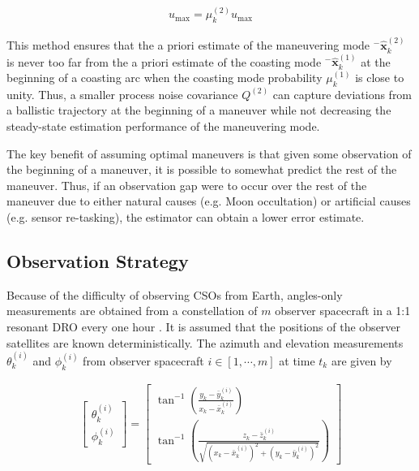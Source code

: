 \documentclass[letterpaper, preprint, paper,11pt]{AAS}	%
\begin{document}
\begin{align}
    u_\text{max} = \mu_k^{(2)} u_\text{max}
\end{align}

This method ensures that the a priori estimate of the maneuvering mode $^-\hat{\bm{x}}_k^{(2)}$ is never too far from the a priori estimate of the coasting mode $^-\hat{\bm{x}}_k^{(1)}$ at the beginning of a coasting arc when the coasting mode probability $\mu_k^{(1)}$ is close to unity. Thus, a smaller process noise covariance $Q^{(2)}$ can capture deviations from a ballistic trajectory at the beginning of a maneuver while not decreasing the steady-state estimation performance of the maneuvering mode. 

The key benefit of assuming optimal maneuvers is that given some observation of the beginning of a maneuver, it is possible to somewhat predict the rest of the maneuver. Thus, if an observation gap were to occur over the rest of the maneuver due to either natural causes (e.g. Moon occultation) or artificial causes (e.g. sensor re-tasking), the estimator can obtain a lower error estimate. 

\subsection{Observation Strategy}

Because of the difficulty of observing CSOs from Earth, angles-only measurements are obtained from a constellation of $m$ observer spacecraft in a 1:1 resonant DRO every one hour \cite{gupta2023constellation}. It is assumed that the positions of the observer satellites are known deterministically. The azimuth and elevation measurements $\theta_k^{(i)}$ and $\phi_k^{(i)}$ from observer spacecraft $i \in [1, \cdots, m]$ at time $t_k$ are given by

\begin{align}
    \begin{bmatrix}
        \theta_k^{(i)} \\
        \phi_k^{(i)}
    \end{bmatrix} = \begin{bmatrix}
        \tan^{-1}\left(\frac{y_k - \bar{y}_k^{(i)}}{x_k - \bar{x}_k^{(i)}}\right) \\
        \tan^{-1}\left(\frac{z_k - \bar{z}_k^{(i)}}{\sqrt{(x_k - \bar{x}_k^{(i)})^2 + (y_k - \bar{y}_k^{(i)})^2}}\right)
    \end{bmatrix}
\end{align}
\end{document}
